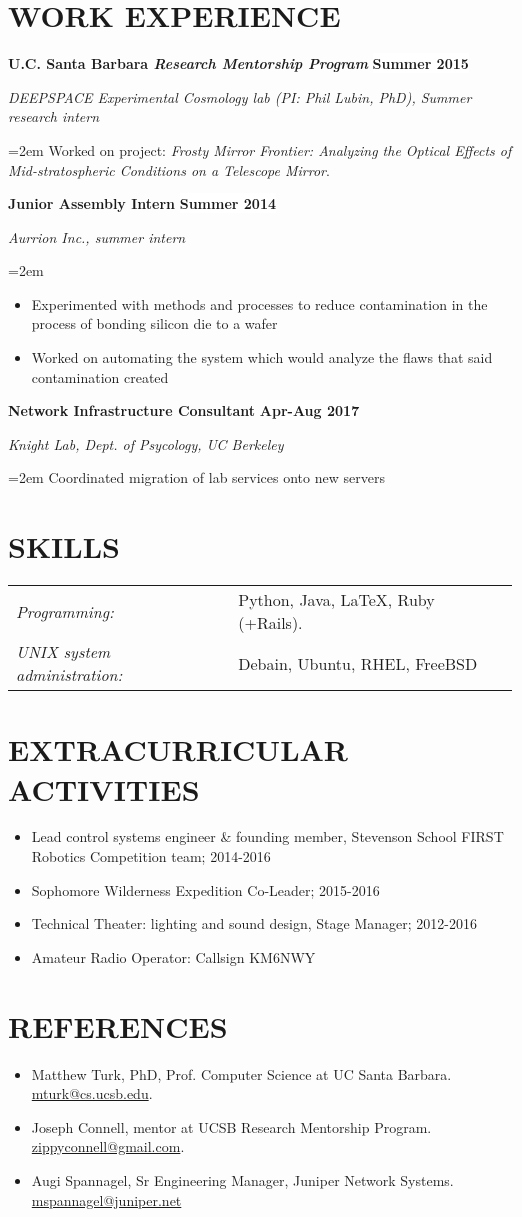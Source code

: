 \documentclass[paper=a4,fontsize=11pt]{scrartcl} %
\newcommand{\sepspace}{\vspace*{0.5em}}		%
\newcommand{\NewPart}[1]{\section*{\uppercase{#1}}}
\newcommand{\EducationEntry}[4]{
		\noindent \textbf{#1} \hfill      %
		\colorbox{White}{%
			\parbox{6.5em}{%
			\hfill\color{Black}\textbf{#2}}} \par  %
		\noindent \textit{#3} \par        %
		\noindent\hangindent=2em\hangafter=0 \small #4 %
		\normalsize \par}
\newcommand{\WorkEntry}[4]{				  %
		\noindent \textbf{#1} \hfill      %
		\colorbox{White}{\color{Black}\textbf{#2}} \par  %
		\noindent \textit{#3} \par              %
		\noindent\hangindent=2em\hangafter=0 \small #4 %
		\normalsize \par}
\begin{document}
\label{WORK}

\NewPart{Work experience}{}

\WorkEntry{U.C. Santa Barbara \textit{Research Mentorship Program}}{Summer 2015}{DEEPSPACE Experimental Cosmology lab (PI: Phil Lubin, PhD), Summer research intern}{Worked on project: \textit{Frosty Mirror Frontier: Analyzing the Optical Effects of Mid-stratospheric Conditions on a Telescope Mirror}.}
\sepspace

\WorkEntry{Junior Assembly Intern}{Summer 2014}{Aurrion Inc., summer intern}{\begin{itemize}\setlength\itemsep{0em}
		\item Experimented with methods and processes to reduce contamination in the process of bonding silicon die to a wafer
		\item Worked on automating the system which would analyze the flaws that said contamination created	\end{itemize} }
	
\WorkEntry{Network Infrastructure Consultant}{Apr-Aug 2017}{Knight Lab, Dept. of Psycology, UC Berkeley}{Coordinated migration of lab services onto new servers}

\vspace{-1em}

\label{SKILLS}
\NewPart{Skills}{}
\begin{tabular}{ll}
\textit{Programming:} & Python, Java, \LaTeX, Ruby (+Rails).\\
\textit{UNIX system administration:} & Debain, Ubuntu, RHEL, FreeBSD\\
\end{tabular}
\vspace{-1em}
\label{EXTRACUR}
\NewPart{Extracurricular Activities}{}
\begin{itemize}\setlength\itemsep{-.5em}
	\item Lead control systems engineer \& founding member, Stevenson School FIRST Robotics Competition team; 2014-2016
	\item Sophomore Wilderness Expedition Co-Leader; 2015-2016
	\item Technical Theater: lighting and sound design, Stage Manager; 2012-2016
	\item Amateur Radio Operator: Callsign KM6NWY
\end{itemize}
\vspace{-2em}
\label{REFERENCES}
\NewPart{References}{}
\begin{itemize}\setlength\itemsep{-.5em}
	\item Matthew Turk, PhD, Prof. Computer Science at UC Santa Barbara. \url{mturk@cs.ucsb.edu}.
	\item Joseph Connell, mentor at UCSB Research Mentorship Program. \url{zippyconnell@gmail.com}.
	\item Augi Spannagel, Sr Engineering Manager, Juniper Network Systems. \url{mspannagel@juniper.net}
\end{itemize}
\end{document}
